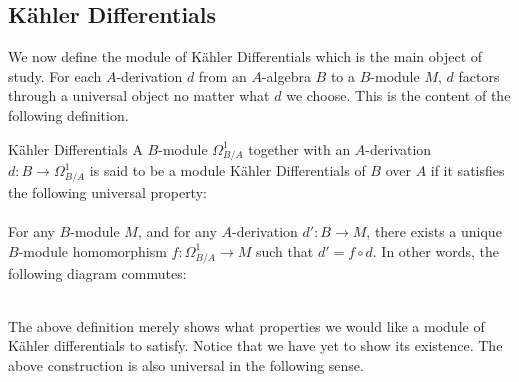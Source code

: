 \documentclass[a4paper]{article}
\begin{document}
\subsection{Kähler Differentials}
We now define the module of Kähler Differentials which is the main object of study. For each $A$-derivation $d$ from an $A$-algebra $B$ to a $B$-module $M$, $d$ factors through a universal object no matter what $d$ we choose. This is the content of the following definition. 

\begin{defn}{Kähler Differentials}{} A $B$-module $\Omega_{B/A}^1$ together with an $A$-derivation $d:B\to\Omega_{B/A}^1$ is said to be a module Kähler Differentials of $B$ over $A$ if it satisfies the following universal property: \\~\\
For any $B$-module $M$, and for any $A$-derivation $d':B\to M$, there exists a unique $B$-module homomorphism $f:\Omega_{B/A}^1\to M$ such that $d'=f\circ d$. In other words, the following diagram commutes: \\~\\
\end{defn}

The above definition merely shows what properties we would like a module of Kähler differentials to satisfy. Notice that we have yet to show its existence. The above construction is also universal in the following sense. 
\end{document}
